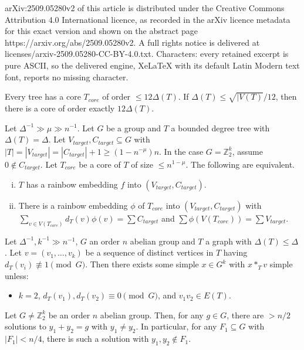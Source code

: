 \documentclass[10pt,a4paper]{amsart}
\newcommand{\id}{{0}}%
\begin{document}
arXiv:2509.05280v2 of this article is distributed under the Creative Commons Attribution 4.0 International licence, as recorded in the arXiv licence metadata for this exact version and shown on the abstract page https://arxiv.org/abs/2509.05280v2. A full rights notice is delivered at licenses/arxiv-2509.05280-CC-BY-4.0.txt. Characters: every retained excerpt is pure ASCII, so the delivered engine, XeLaTeX with its default Latin Modern text font, reports no missing character.
\begin{observation}\label{Observation_small_core}
Every tree has a core $T_{core}$ of order $\leq 12\Delta(T)$.  If $\Delta(T)\leq \sqrt{|V(T)}/12$, then there is a core of order exactly $12\Delta(T)$.
\end{observation}

\begin{theorem}\label{Theorem_embed_tree_prescribed_sets}
Let $\Delta^{-1}\gg\mu\gg n^{-1}$.
Let $G$ be a group and $T$ a bounded degree tree with $\Delta(T)=\Delta$. Let $V_{target},C_{target}\subseteq G$ with $|T|=|V_{target}|=|C_{target}|+1\geq (1-n^{-\mu})n$. In the case $G=\mathbb{Z}_2^k$, assume $\id \not\in C_{target}$. Let $T_{core}$ be a core of $T$ of size $\leq n^{1-\mu}$. The following are equivalent.
\begin{enumerate}[(i)]
\item  $T$ has a rainbow  embedding $f$ into $(V_{target},C_{target})$.
\item There is a rainbow embedding $\phi$ of $T_{core}$ into $(V_{target},C_{target})$ with $\sum_{v\in V(T_{core})}d_T(v)\phi(v)=\sum C_{target}$ and $\sum \phi(V(T_{core}))=\sum V_{target}$.
\end{enumerate} 
\end{theorem}

\begin{lemma}\label{Lemma_kastv_simple_tree}
Let $\Delta^{-1}, k^{-1}\gg n^{-1}$, $G$ an order $n$ abelian group and $T$ a graph with $\Delta(T)\leq \Delta$. Let $v=(v_1, \dots, v_k)$ be a sequence of distinct vertices in $T$ having $d_T(v_i)\not\equiv 1 \pmod G$. Then there exists some simple $x\in G^{k}$ with $x \ast_T v$ simple unless:
\begin{itemize}
\item[$(\ast)$] $k=2$, $d_T(v_1), d_T(v_2)\equiv 0 \pmod G$, and $v_1v_2\in E(T)$.
\end{itemize}
\end{lemma}

\begin{lemma}\label{Lemma_y1y2_separate}
Let $G\neq \mathbb{Z}_2^k$ be an order $n$ abelian group. Then, for any $g\in G$, there are $> n/2$ solutions to $y_1+y_2=g$ with $y_1\neq y_2$. In particular, for any $F_1\subseteq G$ with $|F_1|< n/4$, there is such a solution with $y_1, y_2\not\in F_1$.
\end{lemma}
\end{document}
